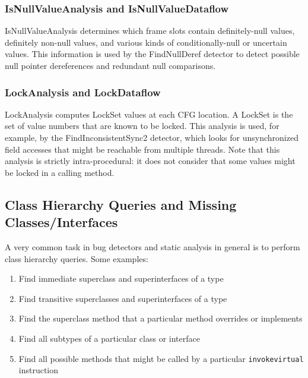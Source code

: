 \documentclass[11pt]{article}
\begin{document}
\subsubsection{IsNullValueAnalysis and IsNullValueDataflow}

IsNullValueAnalysis determines which frame slots contain definitely-null
values, definitely non-null values, and various kinds of conditionally-null
or uncertain values.  This information is used by the FindNullDeref
detector to detect possible null pointer dereferences and redundant null
comparisons.

\subsubsection{LockAnalysis and LockDataflow}

LockAnalysis computes LockSet values at each CFG location.  A LockSet is
the set of value numbers that are known to be locked.  This analysis
is used, for example, by the FindInconsistentSync2 detector, which looks for
unsynchronized field accesses that might be reachable from multiple threads.
Note that this analysis is strictly intra-procedural: it does not consider
that some values might be locked in a calling method.

\subsection{Class Hierarchy Queries and Missing Classes/Interfaces}

A very common task in bug detectors and static analysis in general
is to perform class hierarchy queries.  Some examples:
\begin{enumerate}
\item Find immediate superclass and superinterfaces of a type
\item Find transitive superclasses and superinterfaces of a type
\item Find the superclass method that a particular method overrides or implements
\item Find all subtypes of a particular class or interface
\item Find all possible methods that might be called by a particular
      {\tt invokevirtual} instruction
\end{enumerate}
\end{document}
